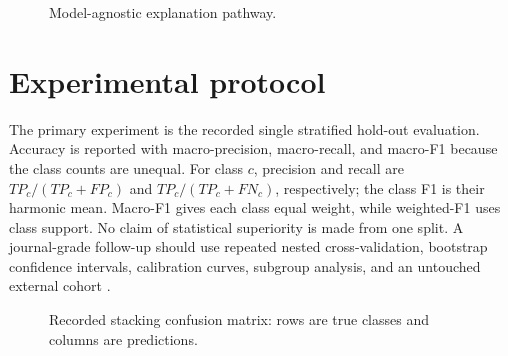 ﻿\documentclass[preprint,12pt]{elsarticle}
\begin{document}
\begin{figure}[t]
\centering
{}
\caption{Model-agnostic explanation pathway.}
\label{fig:shap}
\end{figure}

\section{Experimental protocol}
The primary experiment is the recorded single stratified hold-out evaluation. Accuracy is reported with macro-precision, macro-recall, and macro-F1 because the class counts are unequal. For class $c$, precision and recall are $TP_c/(TP_c+FP_c)$ and $TP_c/(TP_c+FN_c)$, respectively; the class F1 is their harmonic mean. Macro-F1 gives each class equal weight, while weighted-F1 uses class support. No claim of statistical superiority is made from one split. A journal-grade follow-up should use repeated nested cross-validation, bootstrap confidence intervals, calibration curves, subgroup analysis, and an untouched external cohort \cite{riley2021,steyerberg2024,tripodai2024}.

\begin{figure}[t]
\centering
{}
\caption{Recorded stacking confusion matrix: rows are true classes and columns are predictions.}
\label{fig:cm}
\end{figure}
\end{document}
